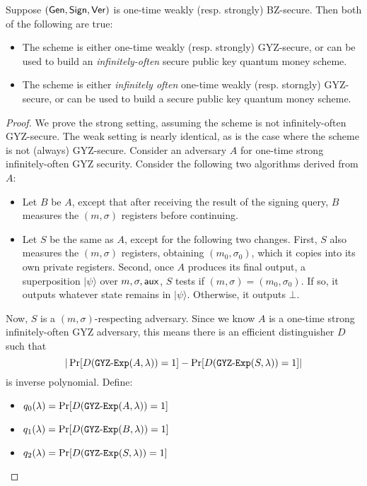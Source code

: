 \begin{theorem} Suppose $({\sf Gen},{\sf Sign},{\sf Ver})$ is one-time weakly (resp. strongly) BZ-secure.   Then both of the following are true:
	\begin{itemize}
		\item The scheme is either one-time weakly (resp. strongly) GYZ-secure, or can be used to build an \emph{infinitely-often} secure  public key quantum money scheme.
		\item The scheme is either \emph{infinitely often} one-time weakly (resp. storngly) GYZ-secure, or can be used to build a secure public key quantum money scheme.
	\end{itemize}
\end{theorem}
\begin{proof} We prove the strong setting, assuming the scheme is not infinitely-often GYZ-secure.  The weak setting is nearly identical, as is the case where the scheme is not (always) GYZ-secure.  Consider an adversary $A$ for one-time strong infinitely-often GYZ security.  Consider the following two algorithms derived from $A$:

\begin{itemize}
	\item Let $B$ be $A$, except that after receiving the result of the signing query, $B$ measures the $(m,\sigma)$ registers before continuing.
	\item Let $S$ be the same as $A$, except for the following two changes.  First, $S$ also measures the $(m,\sigma)$ registers, obtaining $(m_0,\sigma_0)$, which it copies into its own private registers.  Second, 	once $A$ produces its final output, a superposition $|\psi\rangle$ over $m,\sigma,{\sf aux}$, $S$ tests if $(m,\sigma)=(m_0,\sigma_0)$.  If so, it outputs whatever state remains in $|\psi\rangle$.  Otherwise, it outputs $\bot$.
\end{itemize}
	
Now, $S$ is a $(m,\sigma)$-respecting adversary.  Since we know $A$ is a one-time strong infinitely-often GYZ adversary, this means there is an efficient distinguisher $D$ such that \[|\Pr[D({\tt{GYZ\text{-}Exp}}(A,\lambda))=1]-\Pr[D({\tt{GYZ\text{-}Exp}}(S,\lambda))=1]|\]
is inverse polynomial.  Define:
\begin{itemize}
	\item $q_0(\lambda)=	\Pr[D({\tt{GYZ\text{-}Exp}}(A,\lambda))=1]$
	\item $q_1(\lambda)=	\Pr[D({\tt{GYZ\text{-}Exp}}(B,\lambda))=1]$
	\item $q_2(\lambda)=	\Pr[D({\tt{GYZ\text{-}Exp}}(S,\lambda))=1]$
\end{itemize}


\end{proof}

